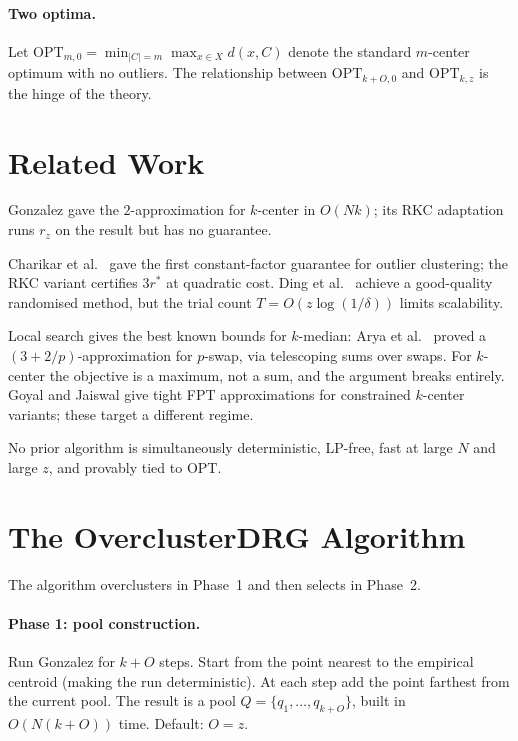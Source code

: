 \documentclass{siam}
\newcommand{\OPT}{\mathrm{OPT}}
\newcommand{\rz}{r_z}
\begin{document}
\paragraph{Two optima.}
Let $\OPT_{m,0}=\min_{|C|=m}\max_{x\in X}d(x,C)$ denote the
standard $m$-center optimum with no outliers. The relationship between
$\OPT_{k+O,0}$ and $\OPT_{k,z}$ is the hinge of the theory.

\section{Related Work}

Gonzalez \cite{gonzalez1985} gave the $2$-approximation for $k$-center
in $O(Nk)$; its RKC adaptation runs $\rz$ on the result but has no
guarantee.

Charikar et al.\ \cite{charikar2001} gave the first constant-factor
guarantee for outlier clustering; the RKC variant certifies $3r^{*}$
at quadratic cost. Ding et al.\ \cite{ding2019} achieve a good-quality
randomised method, but the trial count $T=O(z\log(1/\delta))$ limits
scalability.

Local search gives the best known bounds for $k$-median: Arya et al.\
\cite{arya2004} proved a $(3+2/p)$-approximation for $p$-swap, via
telescoping sums over swaps. For $k$-center the objective is a maximum,
not a sum, and the argument breaks entirely. Goyal and Jaiswal
\cite{goyal2021} give tight FPT approximations for constrained
$k$-center variants; these target a different regime.

No prior algorithm is simultaneously deterministic, LP-free, fast at
large $N$ and large $z$, and provably tied to $\OPT$.

\section{The OverclusterDRG Algorithm}
\label{sec:algorithm}

The algorithm overclusters in Phase~1 and then selects in Phase~2.

\paragraph{Phase 1: pool construction.}
Run Gonzalez for $k+O$ steps. Start from the point nearest to the
empirical centroid (making the run deterministic). At each step add
the point farthest from the current pool. The result is a pool
$Q=\{q_1,\dots,q_{k+O}\}$, built in $O(N(k{+}O))$ time. Default: $O=z$.
\end{document}
